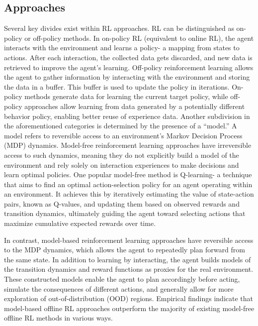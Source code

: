  
\subsection{Approaches}

Several key divides exist within RL approaches. RL can be distinguished as on-policy or off-policy methods. In on-policy RL (equivalent to online RL), the agent interacts with the environment and learns a policy- a mapping from states to actions. After each interaction, the collected data gets discarded, and new data is retrieved to improve the agent’s learning. Off-policy reinforcement learning allows the agent to gather information by interacting with the environment and storing the data in a buffer. This buffer is used to update the policy in iterations. On-policy methods generate data for learning the current target policy, while off-policy approaches allow learning from data generated by a potentially different behavior policy, enabling better reuse of experience data. Another subdivision in the aforementioned categories is determined by the presence of a “model.” A model refers to reversible access to an environment’s Markov Decision Process (MDP) dynamics. Model-free reinforcement learning approaches have irreversible access to such dynamics, meaning they do not explicitly build a model of the environment and rely solely on interaction experiences to make decisions and learn optimal policies. One popular model-free method is Q-learning- a technique that aims to find an optimal action-selection policy for an agent operating within an environment. It achieves this by iteratively estimating the value of state-action pairs, known as Q-values, and updating them based on observed rewards and transition dynamics, ultimately guiding the agent toward selecting actions that maximize cumulative expected rewards over time.

In contrast, model-based reinforcement learning approaches have reversible access to the MDP dynamics, which allows the agent to repeatedly plan forward from the same state. In addition to learning by interacting, the agent builds models of the transition dynamics and reward functions as proxies for the real environment. These constructed models enable the agent to plan accordingly before acting, simulate the consequences of different actions, and generally allow for more exploration of out-of-distribution (OOD) regions. Empirical findings indicate that model-based offline RL approaches outperform the majority of existing model-free offline RL methods in various ways. \\


